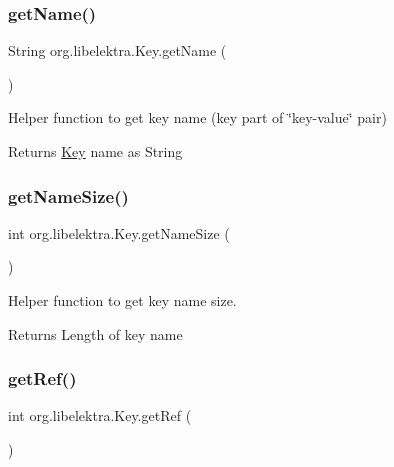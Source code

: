 \subsubsection{\texorpdfstring{getName()}{getName()}}
{\footnotesize\ttfamily String org.\+libelektra.\+Key.\+get\+Name (\begin{DoxyParamCaption}{ }\end{DoxyParamCaption})\hspace{0.3cm}{\ttfamily [inline]}}



Helper function to get key name (key part of \char`\"{}key-\/value\char`\"{} pair) 

\begin{DoxyReturn}{Returns}
\mbox{\hyperlink{classorg_1_1libelektra_1_1Key}{Key}} name as String 
\end{DoxyReturn}
\mbox{\label{classorg_1_1libelektra_1_1Key_aa6477bb5eb12f739858f285650816cc6}} 
\subsubsection{\texorpdfstring{getNameSize()}{getNameSize()}}
{\footnotesize\ttfamily int org.\+libelektra.\+Key.\+get\+Name\+Size (\begin{DoxyParamCaption}{ }\end{DoxyParamCaption})\hspace{0.3cm}{\ttfamily [inline]}}



Helper function to get key name size. 

\begin{DoxyReturn}{Returns}
Length of key name 
\end{DoxyReturn}
\mbox{\label{classorg_1_1libelektra_1_1Key_a3672b9c763ac97d78317b3d54a370107}} 
\subsubsection{\texorpdfstring{getRef()}{getRef()}}
{\footnotesize\ttfamily int org.\+libelektra.\+Key.\+get\+Ref (\begin{DoxyParamCaption}{ }\end{DoxyParamCaption})\hspace{0.3cm}{\ttfamily [inline]}}



